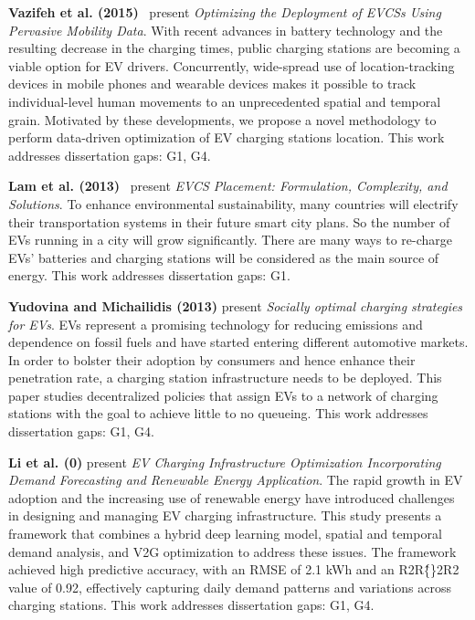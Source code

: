 \documentclass[letterpaper, 12pt, oneside, doublespacing]{Thesis}
\begin{document}
\noindent \textbf{Vazifeh et al. (2015)}~\cite{optimizing_the_2015} present \textit{Optimizing the Deployment of EVCSs Using Pervasive Mobility Data}. With recent advances in battery technology and the resulting decrease in the charging times, public charging stations are becoming a viable option for EV drivers. Concurrently, wide-spread use of location-tracking devices in mobile phones and wearable devices makes it possible to track individual-level human movements to an unprecedented spatial and temporal grain. Motivated by these developments, we propose a novel methodology to perform data-driven optimization of EV charging stations location. This work addresses dissertation gaps: G1, G4.



\noindent \textbf{Lam et al. (2013)}~\cite{electric_vehicle_2013} present \textit{EVCS Placement: Formulation, Complexity, and Solutions}. To enhance environmental sustainability, many countries will electrify their transportation systems in their future smart city plans. So the number of EVs running in a city will grow significantly. There are many ways to re-charge EVs' batteries and charging stations will be considered as the main source of energy. This work addresses dissertation gaps: G1.



\noindent \textbf{Yudovina and Michailidis (2013)} present \textit{Socially optimal charging strategies for EVs}. EVs represent a promising technology for reducing emissions and dependence on fossil fuels and have started entering different automotive markets. In order to bolster their adoption by consumers and hence enhance their penetration rate, a charging station infrastructure needs to be deployed. This paper studies decentralized policies that assign EVs to a network of charging stations with the goal to achieve little to no queueing. This work addresses dissertation gaps: G1, G4.



\noindent \textbf{Li et al. (0)} present \textit{EV Charging Infrastructure Optimization Incorporating Demand Forecasting and Renewable Energy Application}. The rapid growth in EV adoption and the increasing use of renewable energy have introduced challenges in designing and managing EV charging infrastructure. This study presents a framework that combines a hybrid deep learning model, spatial and temporal demand analysis, and V2G optimization to address these issues. The framework achieved high predictive accuracy, with an RMSE of 2.1 kWh and an R2R\^\{\}2R2 value of 0.92, effectively capturing daily demand patterns and variations across charging stations. This work addresses dissertation gaps: G1, G4.
\end{document}
